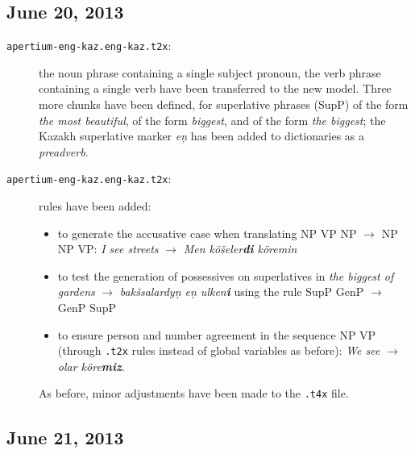 \documentclass{article}
\begin{document}
\subsection{June 20, 2013}
\begin{description}
\item[\texttt{apertium-eng-kaz.eng-kaz.t2x}:] the noun phrase containing a single subject pronoun, the verb phrase containing a single verb have been transferred to the new model. Three more chunks have been defined, for superlative phrases (SupP) of the form \emph{the most beautiful}, of the form \emph{biggest}, and of the form \emph{the biggest}; the Kazakh superlative marker \emph{e\c{n}} has been added to dictionaries as a \emph{preadverb}.
\item[\texttt{apertium-eng-kaz.eng-kaz.t2x}:] rules have been added: 
  \begin{itemize}
  \item to generate the accusative case when translating \(\mathrm{NP}\) \(\mathrm{VP}\) \(\mathrm{NP}\) \(\to\) \(\mathrm{NP}\) \(\mathrm{NP}\) \(\mathrm{VP}\): \emph{I see streets} \(\to\) \emph{Men kö\v{s}eler\textbf{di} köremin}
  \item to test the generation of possessives on superlatives in \emph{the biggest of gardens} \(\to\) \emph{bak\v{s}salardy\c{n} e\c{n} ulken\textbf{i}} using the rule \(\mathrm{SupP}\) \(\mathrm{GenP}\) \(\to\) \(\mathrm{GenP}\)  \(\mathrm{SupP}\)
  \item to ensure person and number agreement in the sequence  \(\mathrm{NP}\)  \(\mathrm{VP}\) (through \texttt{.t2x} rules instead of global variables as before): \emph{We see} \(\to\) \emph{olar köre\textbf{miz}}.
  \end{itemize}
As before, minor adjustments have been made to the \texttt{.t4x} file. 



\end{description}
\subsection{June 21, 2013}
\end{document}
